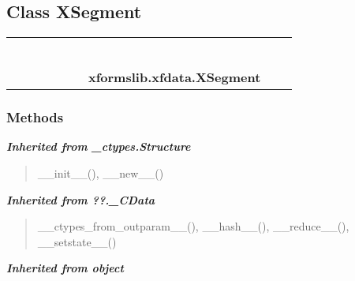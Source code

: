 \subsection{Class XSegment}

    \label{xformslib:xfdata:XSegment}
\begin{tabular}{cccccccccc}
\multicolumn{2}{r}{\settowidth{\BCL}{object}\multirow{2}{\BCL}{object}}
&&
&&
&&
  \\\cline{3-3}
  &&\multicolumn{1}{c|}{}
&&
&&
&&
  \\
\multicolumn{4}{r}{\settowidth{\BCL}{??.\_CData}\multirow{2}{\BCL}{??.\_CData}}
&&
&&
  \\\cline{5-5}
  &&&&\multicolumn{1}{c|}{}
&&
&&
  \\
\multicolumn{6}{r}{\settowidth{\BCL}{\_ctypes.Structure}\multirow{2}{\BCL}{\_ctypes.Structure}}
&&
  \\\cline{7-7}
  &&&&&&\multicolumn{1}{c|}{}
&&
  \\
&&&&&&\multicolumn{2}{l}{\textbf{xformslib.xfdata.XSegment}}
\end{tabular}



  \subsubsection{Methods}


\large{\textbf{\textit{Inherited from \_ctypes.Structure}}}

\begin{quote}
\_\_init\_\_(), \_\_new\_\_()
\end{quote}

\large{\textbf{\textit{Inherited from ??.\_CData}}}

\begin{quote}
\_\_ctypes\_from\_outparam\_\_(), \_\_hash\_\_(), \_\_reduce\_\_(), \_\_setstate\_\_()
\end{quote}

\large{\textbf{\textit{Inherited from object}}}


